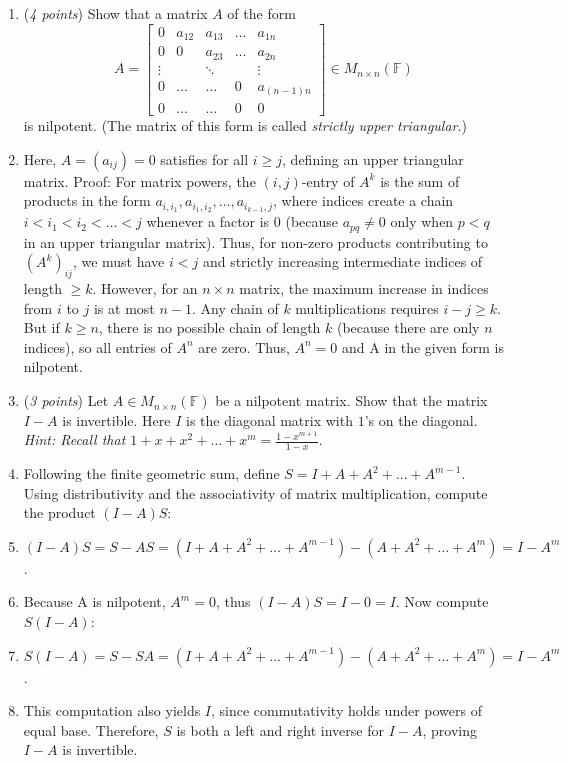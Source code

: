 \documentclass[11pt]{article}
\newcommand{\bbF}{\mathbb{F}}
\theoremstyle{definition}
\numberwithin{equation}{subsection}
\begin{document}
\begin{enumerate}
\begin{enumerate}
\item (\emph{4 points}) Show that a matrix $A$ of the form
$$A = \begin{bmatrix} 
0&a_{12} & a_{13} & \ldots & a_{1n} \\
0& 0& a_{23}& \ldots & a_{2n} \\
\vdots& & \ddots & &  \vdots \\
0& \ldots &\ldots & 0 & a_{(n-1)n} \\
0& \ldots & \ldots & 0 & 0
\end{bmatrix}  \in M_{n\times n}(\bbF)$$
is nilpotent. (The matrix of this form is called \emph{strictly upper triangular}.)
\item[] Here, $A=(a_{ij})=0$ satisfies for all $i\geq j$, defining an upper triangular matrix. Proof: For matrix powers, the $(i,j)$-entry of $A^k$ is the sum of products in the form $a_{i,i_1},a_{i_1,i_2},\ldots,a_{i_{k-1},j}$, where indices create a chain $i<i_1<i_2<\ldots<j$ whenever a factor is 0 (because $a_{pq}\neq 0$ only when $p<q$ in an upper triangular matrix). Thus, for non-zero products contributing to $(A^k)_{ij}$, we must have $i<j$ and strictly increasing intermediate indices of length $\geq k$. However, for an $n\times n$ matrix, the maximum increase in indices from $i$ to $j$ is at most $n-1$. Any chain of $k$ multiplications requires $i-j\geq k$. But if $k\geq n$, there is no possible chain of length $k$ (because there are only $n$ indices), so all entries of $A^n$ are zero. Thus, $A^n=0$ and A in the given form is nilpotent.

\item (\emph{3 points}) Let $A\in M_{n\times n}(\bbF)$ be a nilpotent matrix. Show that the matrix $I-A$ is invertible. Here $I$ is the diagonal matrix with $1$'s on the diagonal. {\it Hint: Recall that $1+x+x^2+\ldots + x^m=\frac{1-x^{m+1}}{1-x}$}.
\item[] Following the finite geometric sum, define $S=I+A+A^2+\ldots +A^{m-1}$. Using distributivity and the associativity of matrix multiplication, compute the product $(I-A)S$:
\item[] $(I-A)S=S-AS=(I+A+A^2+\ldots+A^{m-1})-(A+A^2+\ldots +A^m)=I-A^m$.
\item[] Because A is nilpotent, $A^m=0$, thus $(I-A)S=I-0=I$. Now compute $S(I-A)$: 
\item[] $S(I-A)=S-SA=(I+A+A^2+\ldots+A^{m-1})-(A+A^2+\ldots+A^m)=I-A^m$.
\item[] This computation also yields $I$, since commutativity holds under powers of equal base. Therefore, $S$ is both a left and right inverse for $I-A$, proving $I-A$ is invertible.
\end{enumerate}



\end{enumerate}
\end{document}
